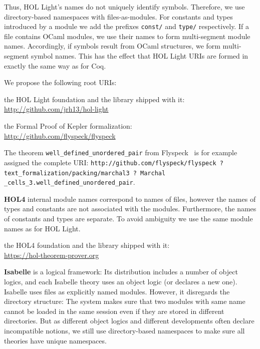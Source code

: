 Thus, HOL Light's names do not uniquely identify symbols.  Therefore, we use
directory-based namespaces with files-as-modules.  For constants and types introduced by a
module we add the prefixes \texttt{const/} and \texttt{type/} respectively.  If a file
contains OCaml modules, we use their names to form multi-segment module names.
Accordingly, if symbols result from OCaml structures, we form multi-segment symbol names.
This has the effect that HOL Light URIs are formed in exactly the same way as for Coq.

We propose the following root URIs:
\begin{compactitem}
 \item the HOL Light foundation and the library shipped with it: \\ \url{http://github.com/jrh13/hol-light}
 \item the Formal Proof of Kepler formalization:\\
   \url{http://github.com/flyspeck/flyspeck}
\end{compactitem}

The theorem \texttt{well\_defined\_unordered\_pair} from Flyspeck~\cite{hales-pisigma15} is for example assigned the complete
URI: \texttt{http://github.com/flyspeck/flyspeck ? text\_formalization/packing/marchal3 ? Marchal\\\_cells\_3.well\_defined\_unordered\_pair}.
\medskip

\textbf{HOL4} internal module names correspond to names of files, however the names
of types and constants are not associated with the modules. Furthermore, the names of
constants and types are separate. To avoid ambiguity we use the same module names as
for HOL Light.%

\begin{compactitem}
 \item the HOL4 foundation and the library shipped with it:\\
 \url{https://hol-theorem-prover.org}
\end{compactitem}
\medskip

\textbf{Isabelle} is a logical framework: Its distribution includes a number of object logics, and each Isabelle theory uses an object logic (or declares a new one).
Isabelle uses files as explicitly named modules.
However, it disregards the directory structure: The system makes sure that two modules with same name cannot be loaded in the same session even if they are stored in different directories.
But as different object logics and different developments often declare incompatible notions, we still use directory-based namespaces to make sure all theories have unique namespaces.

